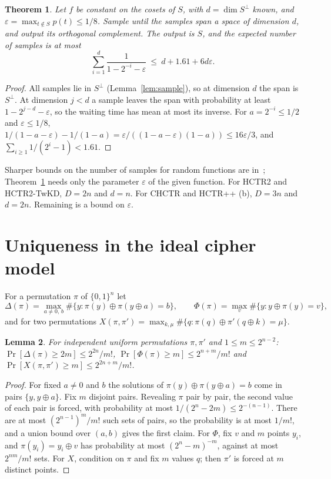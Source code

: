 \documentclass[11pt]{article}
\newtheorem{theorem}{Theorem}[section]
\newtheorem{lemma}[theorem]{Lemma}
\theoremstyle{definition}
\theoremstyle{remark}
\newcommand{\eps}{\varepsilon}
\newcommand{\Dl}{\Delta}
\begin{document}
\begin{theorem}\label{thm:lasvegas}
Let $f$ be constant on the cosets of $S$, with $d=\dim S^\perp$ known, and $\eps=\max_{t\notin S}p(t)\le1/8$. Sample until the samples span a space of dimension $d$, and output its orthogonal complement. The output is $S$, and the expected number of samples is at most
\[
\sum_{i=1}^{d}\frac{1}{1-2^{-i}-\eps}\ \le\ d+1.61+6d\eps.
\]
\end{theorem}

\begin{proof}
All samples lie in $S^\perp$ (Lemma~\ref{lem:sample}), so at dimension $d$ the span is $S^\perp$. At dimension $j<d$ a sample leaves the span with probability at least $1-2^{j-d}-\eps$, so the waiting time has mean at most its inverse. For $a=2^{-i}\le1/2$ and $\eps\le1/8$, $1/(1-a-\eps)-1/(1-a)=\eps/((1-a-\eps)(1-a))\le 16\eps/3$, and $\sum_{i\ge1}1/(2^i-1)<1.61$.
\end{proof}

Sharper bounds on the number of samples for random functions are in~\cite{Bon21}; Theorem~\ref{thm:lasvegas} needs only the parameter $\eps$ of the given function. For HCTR2 and HCTR2-TwKD, $D=2n$ and $d=n$. For CHCTR and HCTR++ (b), $D=3n$ and $d=2n$. Remaining is a bound on $\eps$.

\section{Uniqueness in the ideal cipher model}\label{sec:unique}

For a permutation $\pi$ of $\{0,1\}^n$ let
\[
\Dl(\pi)=\max_{a\ne0,\,b}\#\{y:\pi(y)\oplus\pi(y\oplus a)=b\},\qquad \Phi(\pi)=\max_v\#\{y:y\oplus\pi(y)=v\},
\]
and for two permutations $X(\pi,\pi')=\max_{k,\mu}\#\{q:\pi(q)\oplus\pi'(q\oplus k)=\mu\}$.

\begin{lemma}\label{lem:tail}
For independent uniform permutations $\pi,\pi'$ and $1\le m\le2^{n-2}$:
$\Pr[\Dl(\pi)\ge2m]\le2^{2n}/m!$, $\Pr[\Phi(\pi)\ge m]\le2^{n+m}/m!$ and $\Pr[X(\pi,\pi')\ge m]\le2^{2n+m}/m!$.
\end{lemma}

\begin{proof}
For fixed $a\ne0$ and $b$ the solutions of $\pi(y)\oplus\pi(y\oplus a)=b$ come in pairs $\{y,y\oplus a\}$. Fix $m$ disjoint pairs. Revealing $\pi$ pair by pair, the second value of each pair is forced, with probability at most $1/(2^n-2m)\le2^{-(n-1)}$. There are at most $(2^{n-1})^m/m!$ such sets of pairs, so the probability is at most $1/m!$, and a union bound over $(a,b)$ gives the first claim. For $\Phi$, fix $v$ and $m$ points $y_i$, and $\pi(y_i)=y_i\oplus v$ has probability at most $(2^n-m)^{-m}$, against at most $2^{nm}/m!$ sets. For $X$, condition on $\pi$ and fix $m$ values $q$; then $\pi'$ is forced at $m$ distinct points.
\end{proof}
\end{document}
